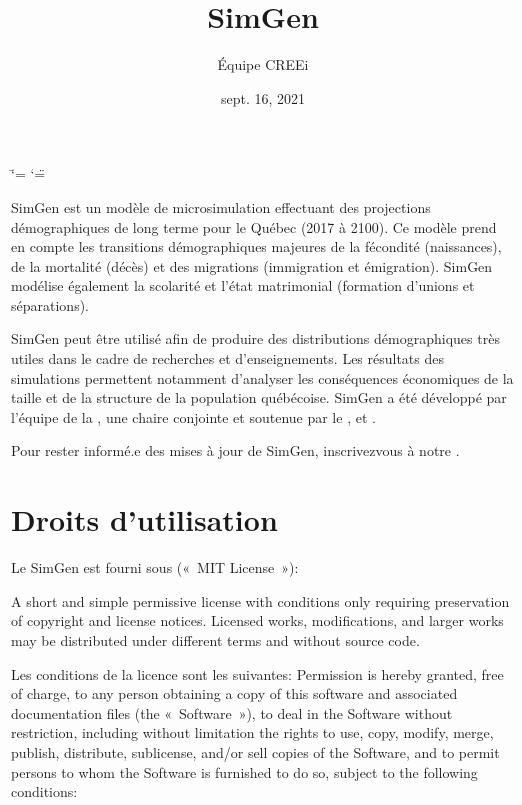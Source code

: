 \documentclass[letterpaper,10pt,french]{sphinxmanual}
\title{SimGen}
\date{sept. 16, 2021}
\author{Équipe CREEi}
\begin{document}
\ifdefined\shorthandoff
  \ifnum\catcode`\=\string=\active\shorthandoff{=}\fi
  \ifnum\catcode`\"=\active{}\fi
\fi

\pagestyle{empty}
\sphinxmaketitle
\pagestyle{plain}
\sphinxtableofcontents
\pagestyle{normal}
\label{\detokenize{index::doc}}


SimGen est un modèle de microsimulation effectuant des projections démographiques de long terme pour le Québec (2017 à 2100).
Ce modèle prend en compte les transitions démographiques majeures de la fécondité (naissances), de la mortalité (décès) et des migrations (immigration et émigration).
SimGen modélise également la scolarité et l’état matrimonial (formation d’unions et séparations).

SimGen peut être utilisé afin de produire des distributions démographiques très utiles dans le cadre de recherches et d’enseignements.
Les résultats des simulations permettent notamment d’analyser les conséquences économiques de la taille et de la structure de la population québécoise.
SimGen a été développé par l’équipe
de la ,
une chaire conjointe  et 
soutenue par le ,  et
.

Pour rester informé.e des mises à jour de SimGen, inscrivez\sphinxhyphen{}vous à notre .


\chapter{Droits d’utilisation}
\label{\detokenize{index:droits-d-utilisation}}
Le SimGen est fourni sous  (« MIT License »):

A short and simple permissive license with conditions only requiring preservation of copyright and license notices. Licensed works, modifications, and larger works may be distributed under different terms and without source code.

Les conditions de la licence sont les suivantes:
Permission is hereby granted, free of charge, to any person obtaining a copy of this software and associated documentation files (the « Software »), to deal in the Software without restriction, including without limitation the rights to use, copy, modify, merge, publish, distribute, sublicense, and/or sell copies of the Software, and to permit persons to whom the Software is furnished to do so, subject to the following conditions:
\end{document}
